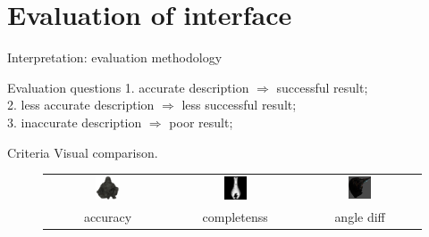 \documentclass[10pt]{beamer}
\begin{document}
\section{Evaluation of interface}
\begin{frame}{Interpretation: evaluation methodology}

\begin{exampleblock}{Evaluation questions}
  1. accurate description $\Rightarrow$ successful result; \\
  2. less accurate description $\Rightarrow$ less successful result;\\
  3. inaccurate description $\Rightarrow$ poor result; \\
\end{exampleblock}

\begin{exampleblock}{Criteria}
  Visual comparison.
\end{exampleblock}

\begin{figure}
\centering
\begin{tabular}{ccc}
\includegraphics[width=0.2\textwidth]{interp/synth_interp/budda_vh} &
\includegraphics[width=0.2\textwidth]{interp/synth_interp/vase0_sl} &
\includegraphics[width=0.2\textwidth]{interp/real_interp/vase/vase_spike} \\
accuracy & completenss & angle diff \\
\end{tabular}
\end{figure}

\end{frame}
\end{document}
